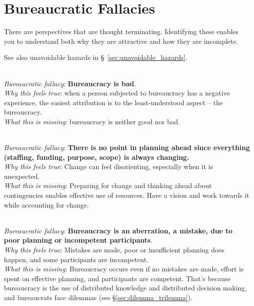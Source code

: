\section{Bureaucratic Fallacies\label{sec:fallacies}}

There are perspectives that are \gls{thought terminating}. Identifying these enables you to understand both why they are attractive and how they are incomplete.

See also unavoidable hazards in \S~\ref{sec:unavoidable_hazards}.

\ \\

\textit{Bureaucratic fallacy}: \textbf{Bureaucracy is bad}. \\
\textit{Why this feels true}: when a person subjected to bureaucracy has a negative experience, the easiest attribution is to the least-understood aspect -- the bureaucracy.\\
\textit{What this is missing}: \Gls{bureaucracy} is neither good nor bad. 

\ \\

\textit{Bureaucratic fallacy}: \textbf{There is no point in planning ahead since everything (staffing, funding, purpose, scope) is always changing.}\\
\textit{Why this feels true}: Change can feel disorienting, especially when it is unexpected. \\
\textit{What this is missing}: Preparing for change and thinking ahead about contingencies enables effective use of resources. Have a vision and work towards it while accounting for change. 


\ \\

\textit{Bureaucratic fallacy}: \textbf{Bureaucracy is an aberration, a mistake, due to poor planning or incompetent participants}. \\
\textit{Why this feels true}: Mistakes are made, poor or insufficient planning does happen, and some participants are incompetent.\\
\textit{What this is missing}: Bureaucracy occurs even if no mistakes are made, effort is spent on effective planning, and participants are competent. That's because bureaucracy is the use of distributed knowledge and distributed decision making, and bureaucrats face dilemmas (see \S\ref{sec:dilemma_trilemma}).

\ \\

